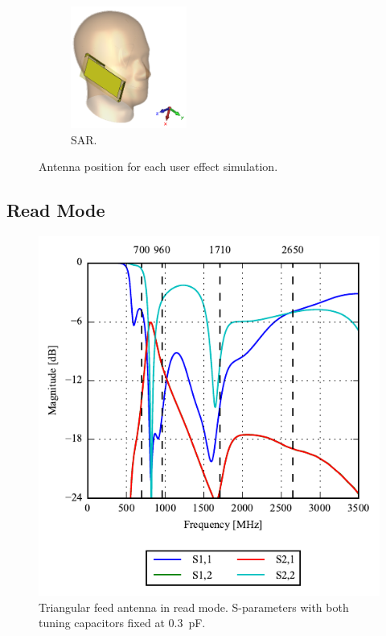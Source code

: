 \begin{figure}[htbp]
\begin{subfigure}[b]{0.24\linewidth}
        \centering
        \includegraphics[width=\linewidth,height=4cm,keepaspectratio]{img/tech_sol/trianglefeed/sar/3d.PNG}
        \caption{SAR.}
    \end{subfigure}
    \caption{Antenna position for each user effect simulation.}
    \label{fig:triang_positions}
\end{figure}

\subsection{Read Mode}

\begin{figure}[htbp]
    \centering
    \includegraphics{img/tech_sol/trianglefeed/read_mode/sparams.pdf}
    \caption{Triangular feed antenna in read mode. S-parameters with both tuning capacitors fixed at \SI{0.3}{pF}.}
    \label{fig:triang_sparam_read}
\end{figure}

